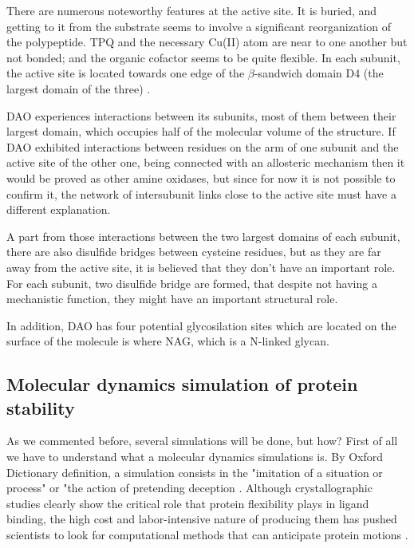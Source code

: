 \documentclass[12pt,twoside]{article}
\begin{document}
There are numerous noteworthy features at the active site. It is buried, and getting to it from the substrate seems to involve a significant reorganization of the polypeptide. TPQ and the necessary Cu(II) atom are near to one another but not bonded; and the organic cofactor seems to be quite flexible.
In each subunit, the active site is located towards one edge of the $\beta$-sandwich domain D4 (the largest domain of the three) \cite{kumar_crystal_1996}.

DAO experiences interactions between its subunits, most of them between their largest domain, which occupies half of the molecular volume of the structure. If DAO exhibited interactions between residues on the arm of one subunit and the active site of the other one, being connected with an allosteric mechanism then it would be proved as other amine oxidases, but since for now it is not possible to confirm it, the network of intersubunit links close to the active site must have a different explanation.

A part from those interactions between the two largest domains of each subunit, there are also disulfide bridges between cysteine residues, but as they are far away from the active site, it is believed that they don't have an important role. For each subunit, two disulfide bridge are formed, that despite not having a mechanistic function, they might have an important structural role\cite{kumar_crystal_1996}.

In addition, DAO has four potential glycosilation sites which are located on the surface of the molecule is where NAG, which is a N-linked glycan.






\subsection{Molecular dynamics simulation of protein stability}
As we commented before, several simulations will be done, but how? First of all we have to understand what a molecular dynamics simulations is.
By Oxford Dictionary definition, a simulation consists in the "imitation of a situation or process" or "the action of pretending deception \cite{Katiyar2018}.
Although crystallographic studies clearly show the critical role that protein flexibility plays in ligand binding, the high cost and labor-intensive nature of producing them has pushed scientists to look for computational methods that can anticipate protein motions \cite{durrant_molecular_2011}. 
\end{document}

